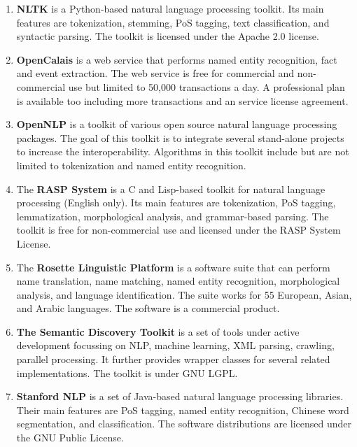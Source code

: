 \begin{enumerate}
	\item \textbf{NLTK} \cite{loper2002nltk} is a Python-based natural language processing toolkit. Its main features are tokenization, stemming, PoS tagging, text classification, and syntactic parsing.
The toolkit is licensed under the Apache 2.0 license.

	\item \textbf{OpenCalais} \cite{opencalais} is a web service that performs named entity recognition, fact and event extraction.
The web service is free for commercial and non-commercial use but limited to 50,000 transactions a day. A professional plan is available too including more transactions and an service license agreement.

	\item \textbf{OpenNLP} \cite{opennlp} is a toolkit of various open source natural language processing packages. The goal of this toolkit is to integrate several stand-alone projects to increase the interoperability. Algorithms in this toolkit include but are not limited to tokenization and named entity recognition.

	\item The \textbf{RASP System} \cite{briscoe2006second} is a C and Lisp-based toolkit for natural language processing (English only). Its main features are tokenization, PoS tagging, lemmatization, morphological analysis, and grammar-based parsing.
The toolkit is free for non-commercial use and licensed under the RASP System License.

	\item The \textbf{Rosette Linguistic Platform} \cite{rosette} is a software suite that can perform name translation, name matching, named entity recognition, morphological analysis, and language identification. The suite works for 55 European, Asian, and Arabic languages.
The software is a commercial product.

	\item \textbf{The Semantic Discovery Toolkit} \cite{semanticdiscovery} is a set of tools under active development focussing on NLP, machine learning, XML parsing, crawling, parallel processing. It further provides wrapper classes for several related implementations. The toolkit is under GNU LGPL.

	\item \textbf{Stanford NLP} \cite{stanfordnlp} is a set of Java-based natural language processing libraries. Their main features are PoS tagging, named entity recognition, Chinese word segmentation, and classification.
The software distributions are licensed under the GNU Public License.


\end{enumerate}
